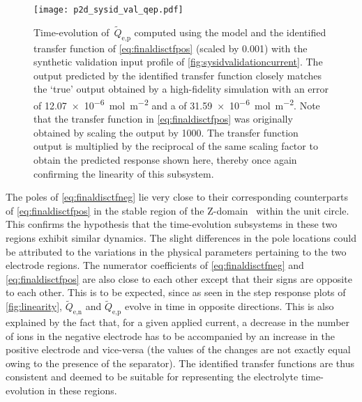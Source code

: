 \begin{figure}[!htbp]
    \centering
    \texttt{[image: p2d\_sysid\_val\_qep.pdf]}
    \caption[$\widetilde{Q}_{\text{e,p}}(t)$ outputs from  and
    identified transfer function for training profile]{%
        Time-evolution of~$\widetilde{Q}_{\text{e,p}}$ computed using the
         model  and the identified transfer function
        of \cref{eq:finaldisctfpos} (scaled by 0.001) with the synthetic
        validation input profile of \cref{fig:sysidvalidationcurrent}. The output
        predicted by the identified transfer function closely matches the `true'
        output obtained by a high-fidelity  simulation with an
         error of \SI{12.07e-6}{\mole\per\meter\squared} and a
         of \SI{31.59e-6}{\mole\per\meter\squared}. Note that the
        transfer function in \cref{eq:finaldisctfpos} was originally obtained by
        scaling the output by 1000. The transfer function output is
        multiplied by the reciprocal of the same scaling factor to obtain the
        predicted response shown here, thereby once again confirming the
        linearity of this subsystem.
    }%
    \label{fig:tfpredQepval}
\end{figure}

The  poles of \cref{eq:finaldisctfneg}  lie  very close  to their  corresponding
counterparts of \cref{eq:finaldisctfpos}  in the  stable region of  the Z-domain
\ie~within   the  unit  circle.   This  confirms  the  hypothesis   that  the
time-evolution subsystems  in these  two regions  exhibit similar  dynamics. The
slight differences in  the pole locations could be attributed  to the variations
in  the  physical  parameters  pertaining  to the  two  electrode  regions.  The
numerator coefficients  of \cref{eq:finaldisctfneg} and \cref{eq:finaldisctfpos}
are  also  close  to  each  other  except  that  their  signs  are  opposite  to
each   other.  This   is  to   be   expected,  since   as  seen   in  the   step
response   plots   of \cref{fig:linearity},   $\widetilde{Q}_{\text{e,n}}$   and
$\widetilde{Q}_{\text{e,p}}$ evolve in time in opposite directions. This is also
explained by  the fact  that, for  a given  applied current,  a decrease  in the
number of ions in the negative electrode has to be accompanied by an increase in
the positive electrode and vice-versa (the values of the changes are not exactly
equal owing to the presence of the separator). The identified transfer functions
are thus consistent  and deemed to be suitable for  representing the electrolyte
time-evolution in these regions.

